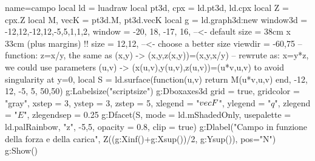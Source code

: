 \documentclass{standalone}
\begin{document}
    \begin{luadraw}{name=campo}
    local ld = luadraw
    local pt3d, cpx = ld.pt3d, ld.cpx
    local Z = cpx.Z
    local M, vecK = pt3d.M, pt3d.vecK
    local g = ld.graph3d:new{
        window3d = {-12,12,-12,12,-5,5,1,1,2},
        window = {-20, 18, -17, 16}, --<- default size = 38cm x 33cm (plus margins) !!
        size = {12,12}, --<- choose a better size
        viewdir = {-60,75}
    }
    -- function: z=x/y, the same as (x,y) -> (x,y,z(x,y))=(x,y,x/y) 
    -- rewrute as: x=y*z, we could use parameters (u,v) -> (x(u,v),y(u,v),z(u,v))=(u*v,u,v) to avoid singularity at y=0,
    local S = ld.surface(function(u,v) return M(u*v,u,v) end, -12, 12, -5, 5, {50,50})
    g:Labelsize("scriptsize")
    g:Dboxaxes3d{
        grid = true, gridcolor = "gray",
        xstep = 3, ystep = 3, zstep = 5,
        xlegend = "$\\vec{F}$", ylegend = "$q$",
        zlegend = "$E$", zlegendsep = 0.25
    }
    g:Dfacet(S, {mode = ld.mShadedOnly, usepalette = {ld.palRainbow, "z", {-5,5}}, opacity = 0.8, clip = true})
    g:Dlabel("Campo in funzione della forza e della carica", Z((g:Xinf()+g:Xsup())/2, g:Ysup()), {pos="N"})
    g:Show()
    \end{luadraw}
\end{document}
